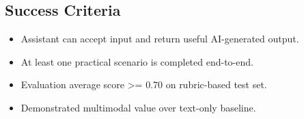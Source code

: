 \documentclass[
]{article}
\providecommand{\tightlist}{%
  \setlength{\itemsep}{0pt}\setlength{\parskip}{0pt}}
\begin{document}
\subsection{Success Criteria}\label{success-criteria}

\begin{itemize}
\tightlist
\item
  Assistant can accept input and return useful AI-generated output.
\item
  At least one practical scenario is completed end-to-end.
\item
  Evaluation average score \textgreater= 0.70 on rubric-based test set.
\item
  Demonstrated multimodal value over text-only baseline.
\end{itemize}
\end{document}
